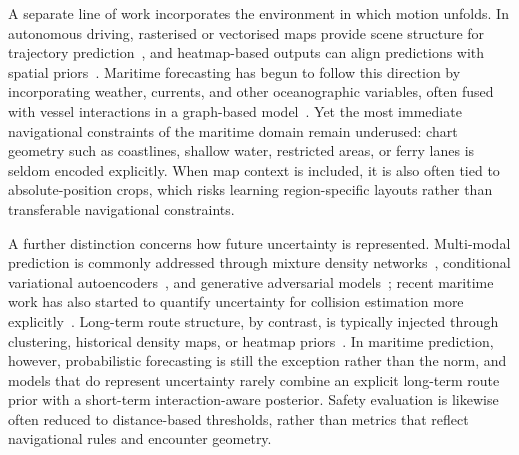 \documentclass[runningheads]{preamp/llncs}
\begin{document}
A separate line of work
incorporates the environment in which motion unfolds.
%
In autonomous driving,
rasterised or vectorised maps provide scene structure
for trajectory prediction~\cite{lee2017desire,gao2020vectornet},
and
heatmap-based outputs can align predictions with spatial priors~\cite{gilles2022gohome}.
%
Maritime forecasting
has begun to follow this direction by incorporating
weather, currents, and other oceanographic variables,
often fused with vessel interactions
in a graph-based model~\cite{liu2026multimodal,slaughter2025vessel}.
Yet the most immediate navigational constraints of the maritime domain remain underused:
chart geometry such as coastlines, shallow water, restricted areas, or ferry lanes
is seldom encoded explicitly.
%
When map context is included,
it is also often tied to absolute-position crops,
which risks learning region-specific layouts rather than transferable navigational constraints.


A further distinction concerns how future uncertainty is represented.
Multi-modal prediction
is commonly addressed through
mixture density networks~\cite{bishop1994mixture},
conditional variational autoencoders~\cite{lee2017desire,ivanovic2019trajectron,salzmann2020trajectron++},
and
generative adversarial models~\cite{jia2023ragan};
%
recent maritime work has also started to quantify uncertainty
for collision estimation more explicitly~\cite{jurkus2025enhancing}.
%
Long-term route structure, by contrast,
is typically injected through
clustering,
historical density maps,
or
heatmap priors~\cite{nguyen2024transformer}.
In maritime prediction, however,
probabilistic forecasting is still the exception rather than the norm,
and models that do represent uncertainty rarely combine an explicit long-term route prior
with a short-term interaction-aware posterior.
%
Safety evaluation is likewise often reduced
to distance-based thresholds, rather than metrics that reflect
navigational rules and encounter geometry.
\end{document}
